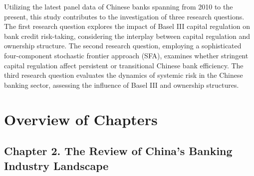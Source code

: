 \documentclass[
  12pt,
  a4paper,
]{scrreprt}
\begin{document}
{{{{Utilizing the latest panel data of Chinese banks spanning from 2010 to
the present, this study contributes to the investigation of three
research questions. The first research question explores the impact of
Basel III capital regulation on bank credit risk-taking, considering the
interplay between capital regulation and ownership structure. The second
research question, employing a sophisticated four-component stochastic
frontier approach (SFA), examines whether stringent capital regulation
affect persistent or transitional Chinese bank efficiency. The third
research question evaluates the dynamics of systemic risk in the Chinese
banking sector, assessing the influence of Basel III and ownership
structures.

\section{Overview of Chapters}\label{overview-of-chapters}

\subsection{Chapter 2. The Review of China's Banking Industry
Landscape}\label{chapter-2.-the-review-of-chinas-banking-industry-landscape}

}}}}
\end{document}
